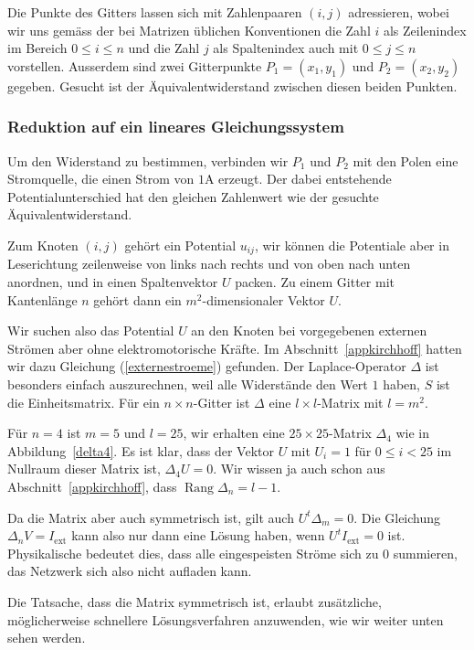 Die Punkte des Gitters lassen sich mit
Zahlenpaaren $(i,j)$ adressieren, wobei wir uns gemäss der bei Matrizen
üblichen Konventionen die Zahl $i$ als Zeilenindex im Bereich $0\le i\le
n$ und die Zahl $j$ als Spaltenindex auch mit $0\le j\le n$ vorstellen.
Ausserdem sind zwei Gitterpunkte $P_1=(x_1,y_1)$ und $P_2=(x_2,y_2)$
gegeben. Gesucht ist der Äquivalentwiderstand zwischen diesen beiden
Punkten.

\subsubsection{Reduktion auf ein lineares Gleichungssystem}
Um den Widerstand zu bestimmen, verbinden wir $P_1$ und $P_2$ mit den
Polen eine Stromquelle, die einen Strom von $1$A erzeugt. Der dabei
entstehende Potentialunterschied hat den gleichen Zahlenwert wie der
gesuchte Äquivalentwiderstand. 

Zum Knoten $(i,j)$ gehört ein Potential $u_{ij}$, wir
können die Potentiale aber in Leserichtung zeilenweise von
links nach rechts und von oben nach unten anordnen, und in
einen Spaltenvektor $U$ packen.
Zu einem Gitter mit Kantenlänge $n$ gehört dann
ein $m^2$-dimensionaler Vektor $U$.


Wir suchen also das Potential $U$ an den Knoten bei vorgegebenen
externen Strömen aber ohne elektromotorische Kräfte.
Im Abschnitt~\ref{appkirchhoff} hatten wir dazu Gleichung
(\ref{externestroeme}) gefunden. Der Laplace-Operator $\Delta$
ist besonders einfach auszurechnen, weil alle Widerstände den Wert
$1$ haben, $S$ ist die Einheitsmatrix.
Für ein $n\times n$-Gitter ist $\Delta$ eine $l\times l$-Matrix
mit $l=m^2$.

Für $n=4$ ist $m=5$ und $l=25$, wir erhalten eine $25\times 25$-Matrix
$\Delta_4$ wie in Abbildung~\ref{delta4}.
Es ist klar, dass der Vektor $U$ mit $U_i=1$ für $0\le i<25$ im Nullraum
dieser Matrix ist, $\Delta_4 U=0$.
Wir wissen ja auch schon aus Abschnitt~\ref{appkirchhoff}, dass 
$\operatorname{Rang}\Delta_n=l-1$.

Da die Matrix aber auch symmetrisch ist, gilt auch $U^t\Delta_m=0$.
Die Gleichung $\Delta_nV=I_{\text{ext}}$ kann also nur dann eine
Lösung haben, wenn $U^tI_{\text{ext}}=0$ ist.
Physikalische bedeutet dies, dass alle
eingespeisten Ströme sich zu 0 summieren, das Netzwerk sich 
also nicht aufladen kann.



Die Tatsache, dass die Matrix symmetrisch ist, erlaubt zusätzliche,
möglicherweise schnellere Lösungsverfahren anzuwenden, wie wir weiter
unten sehen werden.


